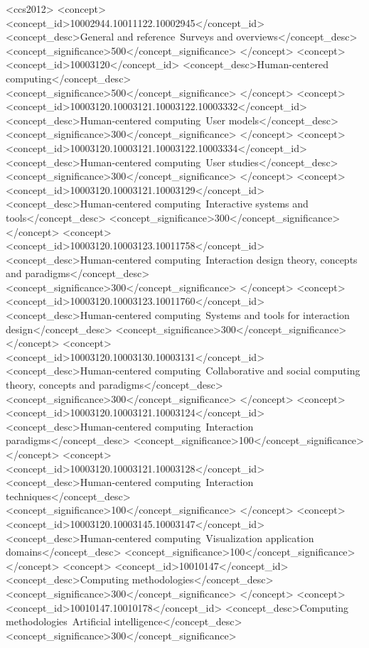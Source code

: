 \begin{CCSXML}
<ccs2012>
<concept>
<concept_id>10002944.10011122.10002945</concept_id>
<concept_desc>General and reference~Surveys and overviews</concept_desc>
<concept_significance>500</concept_significance>
</concept>
<concept>
<concept_id>10003120</concept_id>
<concept_desc>Human-centered computing</concept_desc>
<concept_significance>500</concept_significance>
</concept>
<concept>
<concept_id>10003120.10003121.10003122.10003332</concept_id>
<concept_desc>Human-centered computing~User models</concept_desc>
<concept_significance>300</concept_significance>
</concept>
<concept>
<concept_id>10003120.10003121.10003122.10003334</concept_id>
<concept_desc>Human-centered computing~User studies</concept_desc>
<concept_significance>300</concept_significance>
</concept>
<concept>
<concept_id>10003120.10003121.10003129</concept_id>
<concept_desc>Human-centered computing~Interactive systems and tools</concept_desc>
<concept_significance>300</concept_significance>
</concept>
<concept>
<concept_id>10003120.10003123.10011758</concept_id>
<concept_desc>Human-centered computing~Interaction design theory, concepts and paradigms</concept_desc>
<concept_significance>300</concept_significance>
</concept>
<concept>
<concept_id>10003120.10003123.10011760</concept_id>
<concept_desc>Human-centered computing~Systems and tools for interaction design</concept_desc>
<concept_significance>300</concept_significance>
</concept>
<concept>
<concept_id>10003120.10003130.10003131</concept_id>
<concept_desc>Human-centered computing~Collaborative and social computing theory, concepts and paradigms</concept_desc>
<concept_significance>300</concept_significance>
</concept>
<concept>
<concept_id>10003120.10003121.10003124</concept_id>
<concept_desc>Human-centered computing~Interaction paradigms</concept_desc>
<concept_significance>100</concept_significance>
</concept>
<concept>
<concept_id>10003120.10003121.10003128</concept_id>
<concept_desc>Human-centered computing~Interaction techniques</concept_desc>
<concept_significance>100</concept_significance>
</concept>
<concept>
<concept_id>10003120.10003145.10003147</concept_id>
<concept_desc>Human-centered computing~Visualization application domains</concept_desc>
<concept_significance>100</concept_significance>
</concept>
<concept>
<concept_id>10010147</concept_id>
<concept_desc>Computing methodologies</concept_desc>
<concept_significance>300</concept_significance>
</concept>
<concept>
<concept_id>10010147.10010178</concept_id>
<concept_desc>Computing methodologies~Artificial intelligence</concept_desc>
<concept_significance>300</concept_significance>

\end{CCSXML}
